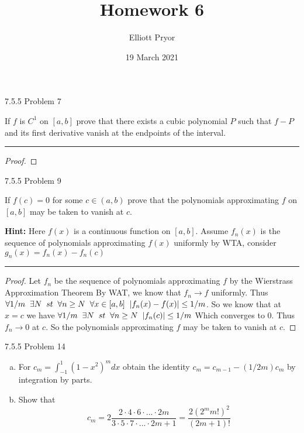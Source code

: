 \documentclass[11pt]{article}
\title{Homework 6}
\author{Elliott Pryor}
\date{19 March 2021}
\begin{document}
\maketitle

 7.5.5 Problem 7

If $f$ is $C^1$ on $[a,b]$ prove that there exists a cubic polynomial $P$
such that $f- P$ and its first derivative vanish at the endpoints of the interval.

\hrule

\begin{proof}
    
    
\end{proof}



 7.5.5 Problem 9 

If $f(c) = 0$ for some $c \in (a,b)$ prove that the polynomials approximating $f$ on 
$[a,b]$ may be taken to vanish at $c$.

\textbf{Hint: } Here $f(x)$ is a continuous function on $[a,b]$.
Assume $f_n(x)$ is the sequence of polynomials approximating $f(x)$ uniformly by WTA,
consider $g_n(x) = f_n(x) - f_n(c)$

\hrule


\begin{proof}
    
    Let $f_n$ be the sequence of polynomials approximating $f$ by the Wierstrass Approximation Theorem
    By WAT, we know that $f_n \to f$ uniformly. Thus
    $\forall 1/m \sp \exists N \sp st \sp \forall n \geq N \sp \forall x \in [a,b] \sp |f_n(x) - f(x)| \leq 1/m$.
    So we know that at $x = c$ we have $\forall 1/m \sp \exists N \sp st \sp \forall n \geq N \sp |f_n(c)| \leq 1/m$
    Which converges to $0$. Thus $f_n \to 0$ at $c$. So the polynomials approximating $f$ may be 
    taken to vanish at $c$.

\end{proof}


 7.5.5 Problem 14

\begin{enumerate}[(a)]
    \item For $c_m = \int_{-1} ^1 (1-x^2)^m dx$ obtain the identity $c_m = c_{m-1} - (1/2m)c_m$ 
    by integration by parts.
    \item Show that 
    $$c_m = 2 \frac{2 \cdot 4 \cdot 6 \cdot ... \cdot 2m}{3 \cdot 5 \cdot 7 \cdot ... \cdot 2m +1} = \frac{2(2^mm!)^2}{(2m +1)!}$$
    
\end{enumerate}
\end{document}
